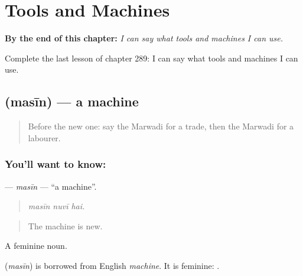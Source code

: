 
\chapter{Tools and Machines}
\label{ch:mw-tools-and-machines}

\begin{chapteropening}
\textbf{By the end of this chapter:} \emph{I can say what tools and machines I can use.}

Complete the last lesson of chapter 289: I can say what tools and machines I can use.
\end{chapteropening}

\section[\texorpdfstring{\mw{मसीन} (masīn)}{मसीन (masīn)}]{ (masīn) — a machine}

\label{lesson:MW-C289-masin}



\begin{quote}
Before the new one: say the Marwadi for a trade, then the Marwadi for a labourer.
\end{quote}

\subsection*{You'll want to know: }
\textbf{} — \emph{masīn} — \textquotedblleft{}a machine\textquotedblright{}.

\begin{quote}
  
\end{quote}

\begin{quote}
\emph{masīn nuvī hai.}
\end{quote}

\begin{quote}
The machine is new.
\end{quote}

A feminine noun.

\begin{cousinweb}
\textbf{} (\emph{masīn}) is borrowed from English \emph{machine}. It is feminine: \textbf{  }.
\end{cousinweb}

